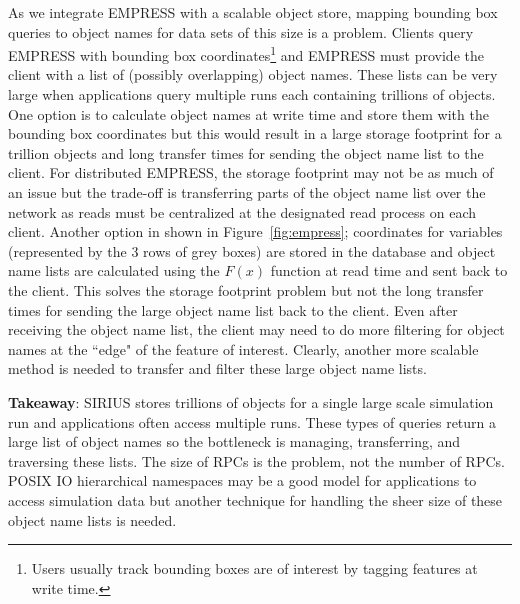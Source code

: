 As we integrate EMPRESS with a scalable object store, mapping bounding box
queries to object names for data sets of this size is a problem. Clients query
EMPRESS with bounding box coordinates\footnote{Users usually track bounding
boxes are of interest by tagging features at write time.} and EMPRESS must
provide the client with a list of (possibly overlapping) object names.  These
lists can be very large when applications query multiple runs each containing
trillions of objects.  One option is to calculate object names at write time
and store them with the bounding box coordinates but this would result in a
large storage footprint for a trillion objects and long transfer times for
sending the object name list to the client.  For distributed EMPRESS, the
storage footprint may not be as much of an issue but the trade-off is
transferring parts of the object name list over the network as reads must be
centralized at the designated read process on each client.  Another option in
shown in Figure~\ref{fig:empress}; coordinates for variables (represented
by the 3 rows of grey boxes) are stored in the database and object name
lists are calculated using the \(F(x)\) function at read time and sent back to
the client. This solves the storage footprint problem but not the long transfer
times for sending the large object name list back to the client.  Even after
receiving the object name list, the client may need to do more filtering for
object names at the ``edge" of the feature of interest.  Clearly, another more
scalable method is needed to transfer and filter these large object name lists.


\textbf{Takeaway}: SIRIUS stores trillions of objects for a single large scale
simulation run and applications often access multiple runs. These types of
queries return a large list of object names so the bottleneck is managing,
transferring, and traversing these lists. The size of RPCs is the problem, not
the number of RPCs.  POSIX IO hierarchical namespaces may be a good model for
applications to access simulation data but another technique for handling the
sheer size of these object name lists is needed.

